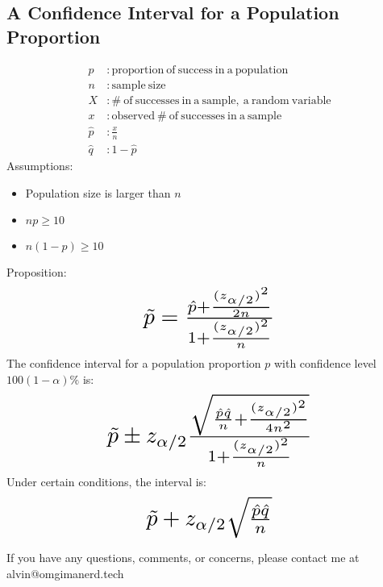 \documentclass[letterpaper, 12pt]{math}
\begin{document}
\subsection*{A Confidence Interval for a Population Proportion}
\begin{align*}
  p&: \mathrm{proportion\ of\ success\ in\ a\ population} \\
  n&: \mathrm{sample\ size} \\
  X&: \mathrm{\#\ of\ successes\ in\ a\ sample,\ a\ random\ variable} \\
  x&: \mathrm{observed\ \#\ of\ successes\ in\ a\ sample} \\
  \hat{p}&: \frac{x}{n} \\
  \hat{q}&: 1-\hat{p}
\end{align*}
Assumptions:
\begin{itemize}
  \item Population size is larger than \( n \)
  \item \( np\geq 10 \)
  \item \( n(1-p)\geq 10 \)
\end{itemize}
Proposition:
\[ \scalebox{2}{$
  \tilde{p} = \frac{\hat{p}+\frac{(z_{\alpha/2})^{2}}{2n}}
  {1+\frac{(z_{\alpha/2})^{2}}{n}}
$} \]
The confidence interval for a population proportion \( p \) with confidence
level \( 100(1-\alpha)\% \) is:
\[ \scalebox{2}{$
  \tilde{p}\pm z_{\alpha/2}\frac{\sqrt{
  \frac{\hat{p}\hat{q}}{n}+\frac{(z_{\alpha/2})^{2}}{4n^{2}}
  }}{1+\frac{(z_{\alpha/2})^{2}}{n}}
$} \]
Under certain conditions, the interval is:
\[ \scalebox{2}{$
  \tilde{p}+z_{\alpha/2}\sqrt{\frac{\hat{p}\hat{q}}{n}}
$} \]

\begin{center}
  If you have any questions, comments, or concerns, please contact me at
  alvin@omgimanerd.tech
\end{center}
\end{document}
